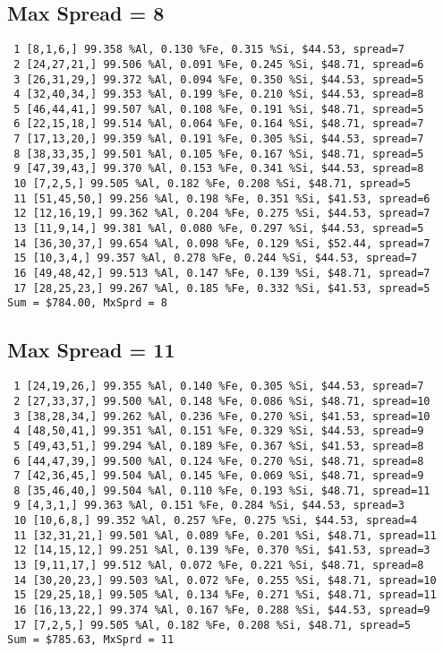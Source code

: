 \documentclass{article}
\begin{document}
\subsection{Max Spread = 8}
\begin{verbatim}
 1 [8,1,6,] 99.358 %Al, 0.130 %Fe, 0.315 %Si, $44.53, spread=7
 2 [24,27,21,] 99.506 %Al, 0.091 %Fe, 0.245 %Si, $48.71, spread=6
 3 [26,31,29,] 99.372 %Al, 0.094 %Fe, 0.350 %Si, $44.53, spread=5
 4 [32,40,34,] 99.353 %Al, 0.199 %Fe, 0.210 %Si, $44.53, spread=8
 5 [46,44,41,] 99.507 %Al, 0.108 %Fe, 0.191 %Si, $48.71, spread=5
 6 [22,15,18,] 99.514 %Al, 0.064 %Fe, 0.164 %Si, $48.71, spread=7
 7 [17,13,20,] 99.359 %Al, 0.191 %Fe, 0.305 %Si, $44.53, spread=7
 8 [38,33,35,] 99.501 %Al, 0.105 %Fe, 0.167 %Si, $48.71, spread=5
 9 [47,39,43,] 99.370 %Al, 0.153 %Fe, 0.341 %Si, $44.53, spread=8
 10 [7,2,5,] 99.505 %Al, 0.182 %Fe, 0.208 %Si, $48.71, spread=5
 11 [51,45,50,] 99.256 %Al, 0.198 %Fe, 0.351 %Si, $41.53, spread=6
 12 [12,16,19,] 99.362 %Al, 0.204 %Fe, 0.275 %Si, $44.53, spread=7
 13 [11,9,14,] 99.381 %Al, 0.080 %Fe, 0.297 %Si, $44.53, spread=5
 14 [36,30,37,] 99.654 %Al, 0.098 %Fe, 0.129 %Si, $52.44, spread=7
 15 [10,3,4,] 99.357 %Al, 0.278 %Fe, 0.244 %Si, $44.53, spread=7
 16 [49,48,42,] 99.513 %Al, 0.147 %Fe, 0.139 %Si, $48.71, spread=7
 17 [28,25,23,] 99.267 %Al, 0.185 %Fe, 0.332 %Si, $41.53, spread=5
Sum = $784.00, MxSprd = 8      
\end{verbatim}
\subsection{Max Spread = 11}
\begin{verbatim}
 1 [24,19,26,] 99.355 %Al, 0.140 %Fe, 0.305 %Si, $44.53, spread=7
 2 [27,33,37,] 99.500 %Al, 0.148 %Fe, 0.086 %Si, $48.71, spread=10
 3 [38,28,34,] 99.262 %Al, 0.236 %Fe, 0.270 %Si, $41.53, spread=10
 4 [48,50,41,] 99.351 %Al, 0.151 %Fe, 0.329 %Si, $44.53, spread=9
 5 [49,43,51,] 99.294 %Al, 0.189 %Fe, 0.367 %Si, $41.53, spread=8
 6 [44,47,39,] 99.500 %Al, 0.124 %Fe, 0.270 %Si, $48.71, spread=8
 7 [42,36,45,] 99.504 %Al, 0.145 %Fe, 0.069 %Si, $48.71, spread=9
 8 [35,46,40,] 99.504 %Al, 0.110 %Fe, 0.193 %Si, $48.71, spread=11
 9 [4,3,1,] 99.363 %Al, 0.151 %Fe, 0.284 %Si, $44.53, spread=3
 10 [10,6,8,] 99.352 %Al, 0.257 %Fe, 0.275 %Si, $44.53, spread=4
 11 [32,31,21,] 99.501 %Al, 0.089 %Fe, 0.201 %Si, $48.71, spread=11
 12 [14,15,12,] 99.251 %Al, 0.139 %Fe, 0.370 %Si, $41.53, spread=3
 13 [9,11,17,] 99.512 %Al, 0.072 %Fe, 0.221 %Si, $48.71, spread=8
 14 [30,20,23,] 99.503 %Al, 0.072 %Fe, 0.255 %Si, $48.71, spread=10
 15 [29,25,18,] 99.505 %Al, 0.134 %Fe, 0.271 %Si, $48.71, spread=11
 16 [16,13,22,] 99.374 %Al, 0.167 %Fe, 0.288 %Si, $44.53, spread=9
 17 [7,2,5,] 99.505 %Al, 0.182 %Fe, 0.208 %Si, $48.71, spread=5
Sum = $785.63, MxSprd = 11
\end{verbatim}
\end{document}
